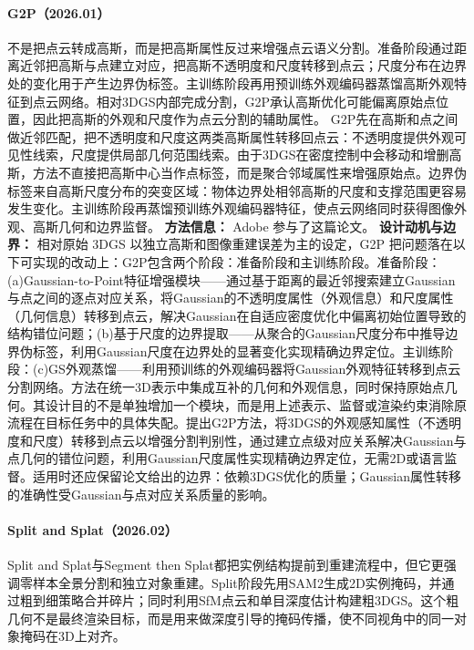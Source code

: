 \paragraph{G2P（2026.01）\cite{2601_03510}}
不是把点云转成高斯，而是把高斯属性反过来增强点云语义分割。准备阶段通过距离近邻把高斯与点建立对应，把高斯不透明度和尺度转移到点云；尺度分布在边界处的变化用于产生边界伪标签。主训练阶段再用预训练外观编码器蒸馏高斯外观特征到点云网络。相对3DGS内部完成分割，G2P承认高斯优化可能偏离原始点位置，因此把高斯的外观和尺度作为点云分割的辅助属性。
G2P先在高斯和点之间做近邻匹配，把不透明度和尺度这两类高斯属性转移回点云：不透明度提供外观可见性线索，尺度提供局部几何范围线索。由于3DGS在密度控制中会移动和增删高斯，方法不直接把高斯中心当作点标签，而是聚合邻域属性来增强原始点。边界伪标签来自高斯尺度分布的突变区域：物体边界处相邻高斯的尺度和支撑范围更容易发生变化。主训练阶段再蒸馏预训练外观编码器特征，使点云网络同时获得图像外观、高斯几何和边界监督。
\textbf{方法信息：} Adobe 参与了这篇论文。
\textbf{设计动机与边界：} 相对原始 3DGS 以独立高斯和图像重建误差为主的设定，G2P 把问题落在以下可实现的改动上：G2P包含两个阶段：准备阶段和主训练阶段。准备阶段：(a)Gaussian-to-Point特征增强模块——通过基于距离的最近邻搜索建立Gaussian与点之间的逐点对应关系，将Gaussian的不透明度属性（外观信息）和尺度属性（几何信息）转移到点云，解决Gaussian在自适应密度优化中偏离初始位置导致的结构错位问题；(b)基于尺度的边界提取——从聚合的Gaussian尺度分布中推导边界伪标签，利用Gaussian尺度在边界处的显著变化实现精确边界定位。主训练阶段：(c)GS外观蒸馏——利用预训练的外观编码器将Gaussian外观特征转移到点云分割网络。方法在统一3D表示中集成互补的几何和外观信息，同时保持原始点几何。其设计目的不是单独增加一个模块，而是用上述表示、监督或渲染约束消除原流程在目标任务中的具体失配。提出G2P方法，将3DGS的外观感知属性（不透明度和尺度）转移到点云以增强分割判别性，通过建立点级对应关系解决Gaussian与点几何的错位问题，利用Gaussian尺度属性实现精确边界定位，无需2D或语言监督。适用时还应保留论文给出的边界：依赖3DGS优化的质量；Gaussian属性转移的准确性受Gaussian与点对应关系质量的影响。
\paragraph{Split and Splat（2026.02）\cite{2602_03809}}
Split and Splat与Segment then Splat都把实例结构提前到重建流程中，但它更强调零样本全景分割和独立对象重建。Split阶段先用SAM2生成2D实例掩码，并通过粗到细策略合并碎片；同时利用SfM点云和单目深度估计构建粗3DGS。这个粗几何不是最终渲染目标，而是用来做深度引导的掩码传播，使不同视角中的同一对象掩码在3D上对齐。

